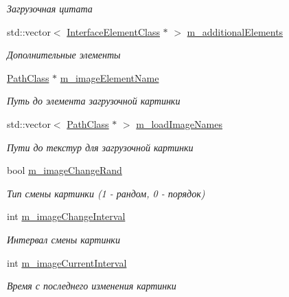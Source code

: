 \begin{DoxyCompactItemize}
\begin{DoxyCompactList}\small\item\em Загрузочная цитата \end{DoxyCompactList}\item 
std\+::vector$<$ \hyperlink{class_interface_element_class}{Interface\+Element\+Class} $\ast$ $>$ \hyperlink{class_load_screen_manager_class_a8d3d70fa04038c320615042aef8bb5fd}{m\+\_\+additional\+Elements}
\begin{DoxyCompactList}\small\item\em Дополнительные элементы \end{DoxyCompactList}\item 
\hyperlink{class_path_class}{Path\+Class} $\ast$ \hyperlink{class_load_screen_manager_class_ae39db8c9812b3cf7dbedf51388c36cc7}{m\+\_\+image\+Element\+Name}
\begin{DoxyCompactList}\small\item\em Путь до элемента загрузочной картинки \end{DoxyCompactList}\item 
std\+::vector$<$ \hyperlink{class_path_class}{Path\+Class} $\ast$ $>$ \hyperlink{class_load_screen_manager_class_ae2b9b23dd1ec54e9eca1585d107fdf05}{m\+\_\+load\+Image\+Names}
\begin{DoxyCompactList}\small\item\em Пути до текстур для загрузочной картинки \end{DoxyCompactList}\item 
bool \hyperlink{class_load_screen_manager_class_ab6623e571e9e0fe7bd316d219ce2cc5f}{m\+\_\+image\+Change\+Rand}
\begin{DoxyCompactList}\small\item\em Тип смены картинки (1 -\/ рандом, 0 -\/ порядок) \end{DoxyCompactList}\item 
int \hyperlink{class_load_screen_manager_class_a7e617d505fb56b152e9645c79f412672}{m\+\_\+image\+Change\+Interval}
\begin{DoxyCompactList}\small\item\em Интервал смены картинки \end{DoxyCompactList}\item 
int \hyperlink{class_load_screen_manager_class_a09b449e1b6aeb563f7f4075d97388109}{m\+\_\+image\+Current\+Interval}
\begin{DoxyCompactList}\small\item\em Время с последнего изменения картинки \end{DoxyCompactList}\item 

\end{DoxyCompactItemize}
